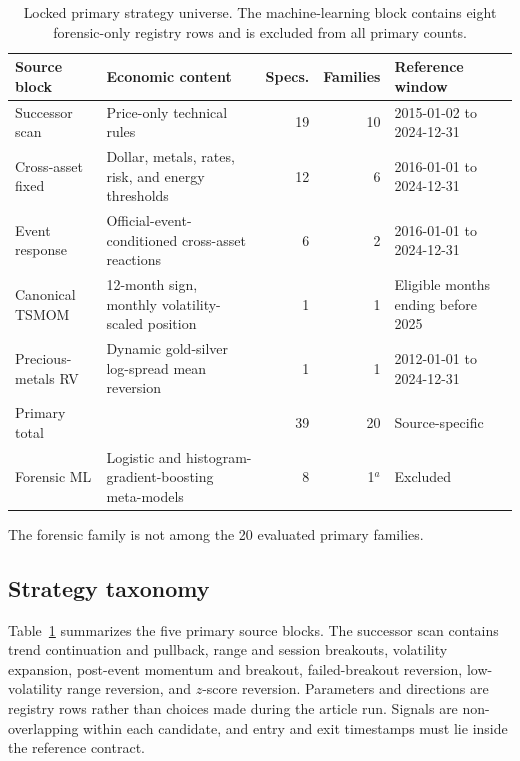 \begin{table}[t]
\centering
\caption{Locked primary strategy universe. The machine-learning block contains eight forensic-only registry rows and is excluded from all primary counts.}\label{tab:universe}
\begin{threeparttable}
\small
\begin{tabular}{p{2.65cm}p{3.15cm}rrp{3.1cm}}
\toprule
Source block & Economic content & Specs. & Families & Reference window \\
\midrule
Successor scan & Price-only technical rules & 19 & 10 & 2015-01-02 to 2024-12-31 \\
Cross-asset fixed & Dollar, metals, rates, risk, and energy thresholds & 12 & 6 & 2016-01-01 to 2024-12-31 \\
Event response & Official-event-conditioned cross-asset reactions & 6 & 2 & 2016-01-01 to 2024-12-31 \\
Canonical TSMOM & 12-month sign, monthly volatility-scaled position & 1 & 1 & Eligible months ending before 2025 \\
Precious-metals RV & Dynamic gold-silver log-spread mean reversion & 1 & 1 & 2012-01-01 to 2024-12-31 \\
\midrule
Primary total & & 39 & 20 & Source-specific \\
Forensic ML & Logistic and histogram-gradient-boosting meta-models & 8 & 1$^{a}$ & Excluded \\
\bottomrule
\end{tabular}
\begin{tablenotes}[flushleft]\footnotesize
\item[$^{a}$] The forensic family is not among the 20 evaluated primary families.
\end{tablenotes}
\end{threeparttable}
\end{table}

\subsection{Strategy taxonomy}\label{subsec:taxonomy}

Table~\ref{tab:universe} summarizes the five primary source blocks. The successor scan contains trend continuation and pullback, range and session breakouts, volatility expansion, post-event momentum and breakout, failed-breakout reversion, low-volatility range reversion, and $z$-score reversion. Parameters and directions are registry rows rather than choices made during the article run. Signals are non-overlapping within each candidate, and entry and exit timestamps must lie inside the reference contract.


